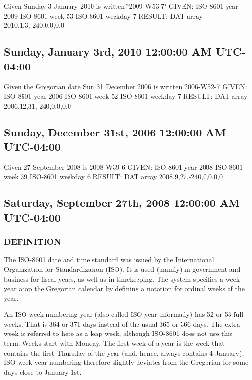 Given Sunday 3 January 2010 is written \char`\"{}2009-\/\+W53-\/7\char`\"{} G\+I\+V\+EN\+: I\+S\+O-\/8601 year 2009 I\+S\+O-\/8601 week 53 I\+S\+O-\/8601 weekday 7 R\+E\+S\+U\+LT\+: D\+AT array 2010,1,3,-\/240,0,0,0,0 \subsection*{Sunday, January 3rd, 2010 12\+:00\+:00 AM U\+T\+C-\/04\+:00 }

Given the Gregorian date Sun 31 December 2006 is written 2006-\/\+W52-\/7 G\+I\+V\+EN\+: I\+S\+O-\/8601 year 2006 I\+S\+O-\/8601 week 52 I\+S\+O-\/8601 weekday 7 R\+E\+S\+U\+LT\+: D\+AT array 2006,12,31,-\/240,0,0,0,0 \subsection*{Sunday, December 31st, 2006 12\+:00\+:00 AM U\+T\+C-\/04\+:00 }

Given 27 September 2008 is 2008-\/\+W39-\/6 G\+I\+V\+EN\+: I\+S\+O-\/8601 year 2008 I\+S\+O-\/8601 week 39 I\+S\+O-\/8601 weekday 6 R\+E\+S\+U\+LT\+: D\+AT array 2008,9,27,-\/240,0,0,0,0 \subsection*{Saturday, September 27th, 2008 12\+:00\+:00 AM U\+T\+C-\/04\+:00 }

\subsubsection*{D\+E\+F\+I\+N\+I\+T\+I\+ON}

The I\+S\+O-\/8601 date and time standard was issued by the International Organization for Standardization (I\+SO). It is used (mainly) in government and business for fiscal years, as well as in timekeeping. The system specifies a week year atop the Gregorian calendar by defining a notation for ordinal weeks of the year.

An I\+SO week-\/numbering year (also called I\+SO year informally) has 52 or 53 full weeks. That is 364 or 371 days instead of the usual 365 or 366 days. The extra week is referred to here as a leap week, although I\+S\+O-\/8601 does not use this term. Weeks start with Monday. The first week of a year is the week that contains the first Thursday of the year (and, hence, always contains 4 January). I\+SO week year numbering therefore slightly deviates from the Gregorian for some days close to January 1st.

